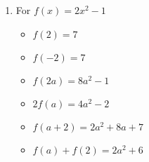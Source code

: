 \begin{enumerate}
\begin{multicols}{3}
\begin{itemize}
\end{itemize}
\end{multicols}

\begin{multicols}{3}
\begin{itemize}

\item  $2 f(a) = 10-4a$
\item $f(a+2) = 1-2a$
\item $f(a) + f(2) = 6-2a$

\end{itemize}
\end{multicols}

\begin{multicols}{3}
\begin{itemize}

\item  $f \left( \frac{2}{a} \right) = 5 - \frac{4}{a}$ \\
$\hphantom{f \left( \frac{2}{a} \right)} = \frac{5a-4}{a}$

\vfill

\columnbreak

\item $\frac{f(a)}{2} = \frac{5-2a}{2}$

\vfill

\columnbreak


\item  $f(a + h) = 5-2a-2h$

\end{itemize}
\end{multicols}


\item For $f(x) = 2x^2-1$

\begin{multicols}{3}
\begin{itemize}

\item  $f(2) = 7$
\item  $f(-2) = 7$
\item  $f(2a) = 8a^2-1$

\end{itemize}
\end{multicols}

\begin{multicols}{3}
\begin{itemize}

\item  $2 f(a) = 4a^2-2$
\item $f(a+2) = 2a^2+8a+7$
\item $f(a) + f(2) = 2a^2+6$


\end{itemize}
\end{multicols}
\end{enumerate}
